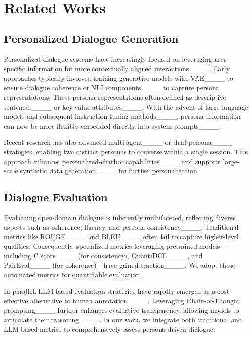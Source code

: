 \section{Related Works}
\label{sec:related}

\subsection{Personalized Dialogue Generation}
\label{sec:related.1} 
Personalized dialogue systems have increasingly focused on leveraging user-specific information for more contextually aligned interactions____. Early approaches typically involved training generative models with VAE____ to ensure dialogue coherence or NLI components____ to capture persona representations. These persona representations often defined as descriptive sentences____ or key-value attributes____. With the advent of large language models and subsequent instruction tuning methods____, persona information can now be more flexibly embedded directly into system prompts____.

Recent research has also advanced multi-agent____ or dual-persona____ strategies, enabling two distinct personas to converse within a single session. This approach enhances personalized-chatbot capabilities____ and supports large-scale synthetic data generation____ for further personalization. 

\subsection{Dialogue Evaluation}
\label{sec:related.2} 
Evaluating open-domain dialogue is inherently multifaceted, reflecting diverse aspects such as coherence, fluency, and persona consistency____. Traditional metrics like ROUGE____ and BLEU____ often fail to capture higher-level qualities. Consequently, specialized metrics leveraging pretrained models—including C score____ (for consistency), QuantiDCE____, and PairEval____ (for coherence)—have gained traction____. We adopt these automated metrics for quantifiable evaluation.

In parallel, LLM-based evaluation strategies have rapidly emerged as a cost-effective alternative to human annotation____. Leveraging Chain-of-Thought prompting____ further enhances evaluative transparency, allowing models to articulate their reasoning____. In our work, we integrate both traditional and LLM-based metrics to comprehensively assess persona-driven dialogue.

